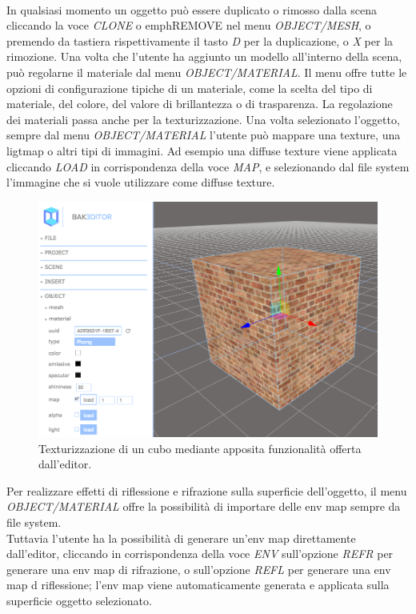 \\
In qualsiasi momento un oggetto può essere duplicato o rimosso dalla scena cliccando la voce \emph{CLONE} o emph{REMOVE} nel menu \emph{OBJECT/MESH}, o premendo da tastiera rispettivamente il tasto \emph{D} per la duplicazione, o \emph{X} per la rimozione.
Una volta che l’utente ha aggiunto un modello all’interno della scena, può regolarne il materiale dal menu \emph{OBJECT/MATERIAL}. Il menu offre tutte le opzioni di configurazione tipiche di un materiale, come la scelta del tipo di materiale, del colore, del valore di brillantezza o di trasparenza. 
La regolazione dei materiali passa anche per la texturizzazione. 
Una volta selezionato l’oggetto, sempre dal menu \emph{OBJECT/MATERIAL} l’utente può mappare una texture, una ligtmap o altri tipi di immagini. Ad esempio una diffuse texture viene applicata cliccando \emph{LOAD} in corrispondenza della voce \emph{MAP}, e selezionando dal file system l’immagine che si vuole utilizzare come diffuse texture. 
\\
\begin{figure}[htb]
 \centering
 \includegraphics[width=1\linewidth]{images/chapter_caso_uso/caso_uso_texture.png}\hfill
 \caption[Texturizzazione]{Texturizzazione di un cubo mediante apposita funzionalità offerta dall'editor.}
 \label{fig:caso_uso_texture}
\end{figure}
Per realizzare effetti di riflessione e rifrazione sulla superficie dell’oggetto, il menu \emph{OBJECT/MATERIAL} offre la possibilità di importare delle env map sempre da file system. 
\\
Tuttavia l’utente ha la possibilità di generare un’env map direttamente dall’editor, cliccando in corrispondenza della voce \emph{ENV} sull’opzione \emph{REFR} per generare una env map di rifrazione, o sull’opzione \emph{REFL} per generare una env map d riflessione; l’env map viene automaticamente generata e applicata sulla superficie oggetto selezionato.
